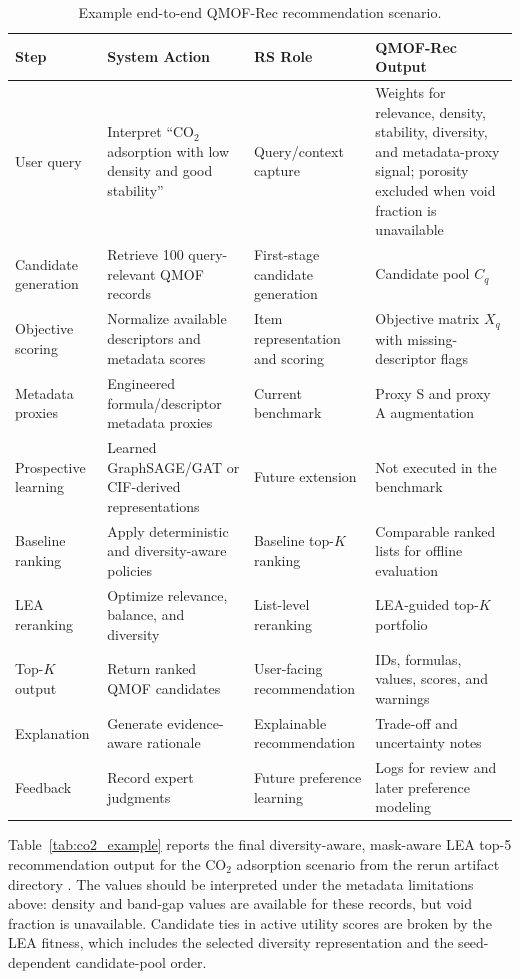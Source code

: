 \documentclass[12pt,a4paper]{article}
\begin{document}
\begin{table}[H]
\centering
\caption{Example end-to-end QMOF-Rec recommendation scenario.}
\label{tab:workflow}
\small
\begin{tabular}{L{2.2cm} L{3.4cm} L{2.8cm} L{4.3cm}}
\toprule
\textbf{Step} & \textbf{System Action} & \textbf{RS Role} & \textbf{QMOF-Rec Output}\\
\midrule
User query & Interpret ``CO$_2$ adsorption with low density and good stability'' & Query/context capture & Weights for relevance, density, stability, diversity, and metadata-proxy signal; porosity excluded when void fraction is unavailable\\
Candidate generation & Retrieve 100 query-relevant QMOF records & First-stage candidate generation & Candidate pool $C_q$\\
Objective scoring & Normalize available descriptors and metadata scores & Item representation and scoring & Objective matrix $X_q$ with missing-descriptor flags\\
Metadata proxies & Engineered formula/descriptor metadata proxies & Current benchmark & Proxy S and proxy A augmentation\\
Prospective learning & Learned GraphSAGE/GAT or CIF-derived representations & Future extension & Not executed in the benchmark\\
Baseline ranking & Apply deterministic and diversity-aware policies & Baseline top-$K$ ranking & Comparable ranked lists for offline evaluation\\
LEA reranking & Optimize relevance, balance, and diversity & List-level reranking & LEA-guided top-$K$ portfolio\\
Top-$K$ output & Return ranked QMOF candidates & User-facing recommendation & IDs, formulas, values, scores, and warnings\\
Explanation & Generate evidence-aware rationale & Explainable recommendation & Trade-off and uncertainty notes\\
Feedback & Record expert judgments & Future preference learning & Logs for review and later preference modeling\\
\bottomrule
\end{tabular}
\end{table}

Table~\ref{tab:co2_example} reports the final diversity-aware, mask-aware LEA top-5 recommendation output for the CO$_2$ adsorption scenario from the rerun artifact directory . The values should be interpreted under the metadata limitations above: density and band-gap values are available for these records, but void fraction is unavailable. Candidate ties in active utility scores are broken by the LEA fitness, which includes the selected diversity representation and the seed-dependent candidate-pool order.
\end{document}
